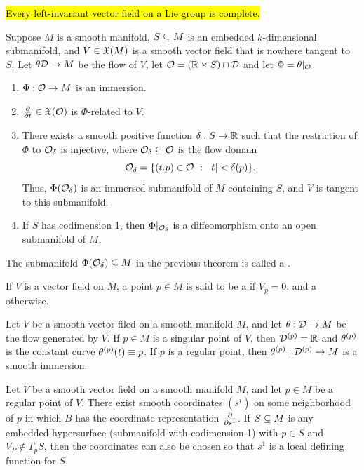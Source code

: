 \begin{thm}
\hl{Every left-invariant vector field on a Lie group is complete.}
\end{thm}

\begin{thm}
Suppose $M$ is a smooth manifold, $S\subseteq M$ is an embedded $k$-dimensional submanifold, and $V\in \mathfrak{X}(M)$ is a smooth vector field that is nowhere tangent to $S$. Let $\theta\mathcal{D}\rightarrow M$ be the flow of $V$, let $\mathcal{O} = (\mathbb{R}\times S)\cap \mathcal{D}$ and let $\Phi = \theta|_{\mathcal{O}}$.
\begin{enumerate}
    \item $\Phi:\mathcal{O}\rightarrow M$ is an immersion.
    \item $\frac{\partial}{\partial t}\in \mathfrak{X}(\mathcal{O})$ is $\Phi$-related to $V$.
    \item There exists a smooth positive function $\delta:S\rightarrow \mathbb{R}$ such that the restriction of $\Phi$ to $\mathcal{O}_\delta$ is injective, where $\mathcal{O}_\delta\subseteq \mathcal{O}$ is the flow domain 
    \[\mathcal{O}_\delta = \{(t.p)\in \mathcal{O}\ :\ |t| < \delta(p)\}.\]
    Thus, $\Phi(\mathcal{O}_\delta)$ is an immersed submanifold of $M$ containing $S$, and $V$ is tangent to this submanifold.
    \item If $S$ has codimension 1, then $\Phi|_{\mathcal{O}_\delta}$ is a diffeomorphism onto an open submanifold of $M$.
\end{enumerate}
\end{thm}

\dfn The submanifold $\Phi(\mathcal{O}_\delta)\subseteq M$ in the previous theorem is called a .

\dfng If $V$ is a vector field on $M$, a point $p\in M$ is said to be a  if $V_p = 0$, and a  otherwise.

\setcounter{thm}{20}

\begin{prop}
Let $V$ be a smooth vector filed on a smooth manifold $M$, and let $\theta:\mathcal{D}\rightarrow M$ be the flow generated by $V$. If $p\in M$ is a singular point of $V$, then $\mathcal{D}^{(p)} = \mathbb{R}$ and $\theta^{(p)}$ is the constant curve $\theta^{(p)}(t)\equiv p$. If $p$ is a regular point, then $\theta^{(p)}:\mathcal{D}^{(p)}\rightarrow M$ is a smooth immersion.
\end{prop}

\begin{thm}
Let $V$ be a smooth vector field on a smooth manifold $M$, and let $p\in M$ be a regular point of $V$. There exist smooth coordinates $(s^i)$ on some neighborhood of $p$ in which $B$ has the coordinate representation $\frac{\partial}{\partial s^1}$. If $S\subseteq M$ is any embedded hypersurface (submanifold with codimension 1) with $p\in S$ and $V_P\nin T_pS$, then the coordinates can also be chosen so that $s^1$ is a local defining function for $S$.
\end{thm}


